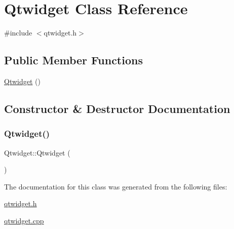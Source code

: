 \hypertarget{class_qtwidget}{}\section{Qtwidget Class Reference}
\label{class_qtwidget}


{\ttfamily \#include $<$qtwidget.\+h$>$}

\subsection*{Public Member Functions}
\begin{DoxyCompactItemize}
\item 
\hyperlink{class_qtwidget_a55dadff4792a1487c28d1617da653bfb}{Qtwidget} ()
\end{DoxyCompactItemize}


\subsection{Constructor \& Destructor Documentation}
\mbox{\label{class_qtwidget_a55dadff4792a1487c28d1617da653bfb}} 
\subsubsection{\texorpdfstring{Qtwidget()}{Qtwidget()}}
{\footnotesize\ttfamily Qtwidget\+::\+Qtwidget (\begin{DoxyParamCaption}{ }\end{DoxyParamCaption})}



The documentation for this class was generated from the following files\+:\begin{DoxyCompactItemize}
\item 
\hyperlink{qtwidget_8h}{qtwidget.\+h}\item 
\hyperlink{qtwidget_8cpp}{qtwidget.\+cpp}\end{DoxyCompactItemize}
